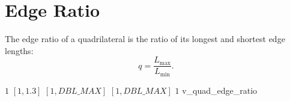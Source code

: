 \section{Edge Ratio}

The edge ratio of a quadrilateral is the ratio of its longest and shortest edge lengths:
\[
  q = \frac{L_{\max}}{L_{\min}}.
\]

%
{$1$}%
{$[1,1.3]$}%
{$[1,DBL\_MAX]$}%
{$[1,DBL\_MAX]$}%
{$1$}%
{\cite{pebay:04}}%
{v\_quad\_edge\_ratio}%

